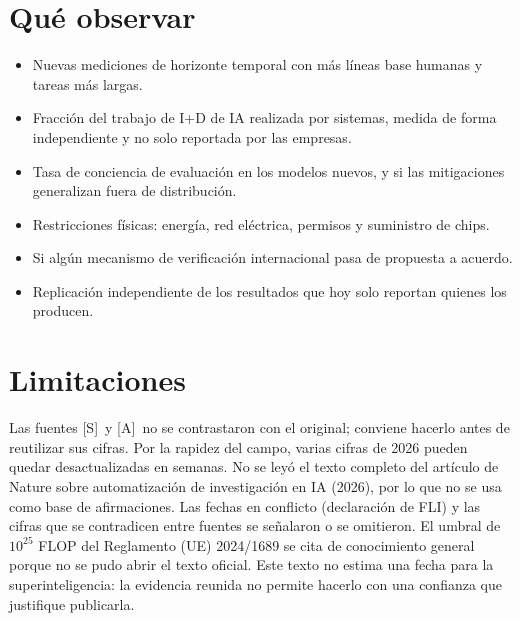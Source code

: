\documentclass[10pt]{article}
\newcommand{\tS}{\textsf{\small[S]}}
\newcommand{\tA}{\textsf{\small[A]}}
\begin{document}
\section{Qu\'e observar}

\begin{itemize}
\item Nuevas mediciones de horizonte temporal con m\'as l\'ineas base humanas y tareas m\'as largas.
\item Fracci\'on del trabajo de I+D de IA realizada por sistemas, medida de forma independiente y no solo reportada por las empresas.
\item Tasa de conciencia de evaluaci\'on en los modelos nuevos, y si las mitigaciones generalizan fuera de distribuci\'on.
\item Restricciones f\'isicas: energ\'ia, red el\'ectrica, permisos y suministro de chips.
\item Si alg\'un mecanismo de verificaci\'on internacional pasa de propuesta a acuerdo.
\item Replicaci\'on independiente de los resultados que hoy solo reportan quienes los producen.
\end{itemize}

\section{Limitaciones}

Las fuentes \tS\ y \tA\ no se contrastaron con el original; conviene hacerlo antes de reutilizar sus cifras. Por la rapidez del campo, varias cifras de 2026 pueden quedar desactualizadas en semanas. No se ley\'o el texto completo del art\'iculo de Nature sobre automatizaci\'on de investigaci\'on en IA (2026), por lo que no se usa como base de afirmaciones. Las fechas en conflicto (declaraci\'on de FLI) y las cifras que se contradicen entre fuentes se se\~nalaron o se omitieron. El umbral de $10^{25}$ FLOP del Reglamento (UE) 2024/1689 se cita de conocimiento general porque no se pudo abrir el texto oficial. Este texto no estima una fecha para la superinteligencia: la evidencia reunida no permite hacerlo con una confianza que justifique publicarla.
\end{document}
